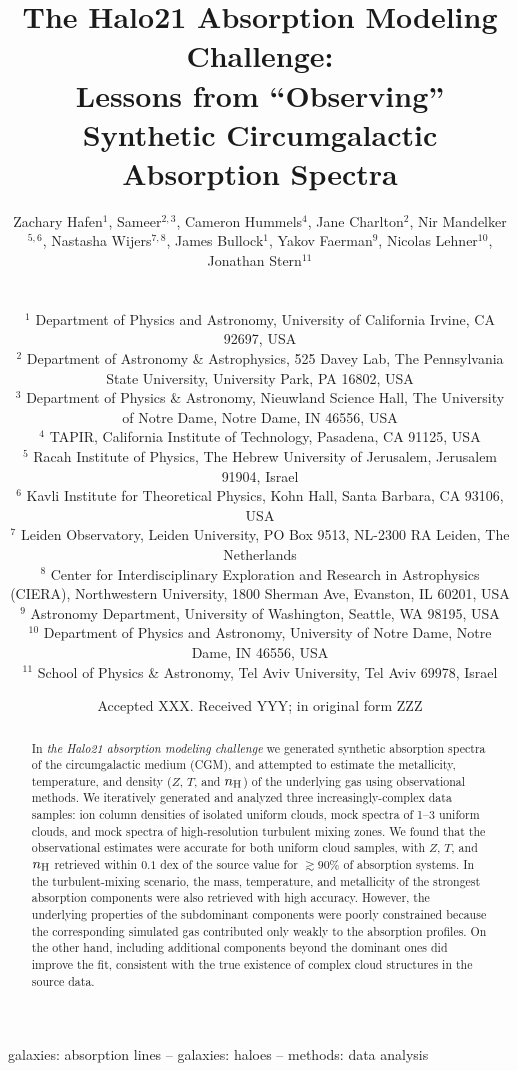 \documentclass[fleqn,usenatbib]{mnras}
\title[``Observing'' Synthetic Circumgalactic Absorption Spectra]{The Halo21 Absorption Modeling Challenge:\\Lessons from ``Observing'' Synthetic Circumgalactic Absorption Spectra}
\author[Hafen, Sameer, et al.]{
\parbox{\textwidth}{
Zachary Hafen$^{1}$,
Sameer$^{2,3}$,
Cameron Hummels$^4$,
Jane Charlton$^2$,
Nir Mandelker$^{5, 6}$,
Nastasha Wijers$^{7, 8}$,
James Bullock$^{1}$,
Yakov Faerman$^{9}$,
Nicolas Lehner$^{10}$,
Jonathan Stern$^{11}$
} \vspace{0.4cm}\\
\parbox{\textwidth}{
$^1$ Department of Physics and Astronomy, University of California Irvine, CA 92697, USA \\
$^{2}$ Department of Astronomy \& Astrophysics, 525 Davey Lab, The Pennsylvania State University, University Park, PA 16802, USA \\
$^{3}$ Department of Physics \& Astronomy, Nieuwland Science Hall, The University of Notre Dame, Notre Dame, IN 46556, USA \\
$^4$ TAPIR, California Institute of Technology, Pasadena, CA 91125, USA \\
$^5$ Racah Institute of Physics, The Hebrew University of Jerusalem,
Jerusalem 91904, Israel \\
$^6$ Kavli Institute for Theoretical Physics, Kohn Hall, Santa Barbara, CA 93106, USA\\
$^7$ Leiden Observatory, Leiden University, PO Box 9513, NL-2300 RA Leiden, The Netherlands \\
$^8$ Center for Interdisciplinary Exploration and Research in Astrophysics (CIERA), Northwestern University, 1800 Sherman Ave, Evanston, IL 60201, USA \\
$^9$ Astronomy Department, University of Washington, Seattle, WA 98195, USA \\
$^{10}$ Department of Physics and Astronomy, University of Notre Dame, Notre Dame, IN 46556, USA \\
$^{11}$ School of Physics \& Astronomy, Tel Aviv University, Tel Aviv 69978, Israel
}
}
\date{Accepted XXX. Received YYY; in original form ZZZ}
\makeatletter
\newcommand{\thoughts}[1]{\textcolor{BurntOrange}{\textbf{Contributions welcome: #1}}}
\newcommand{\todo}[1]{\textcolor{Maroon}{\textbf{Address: #1}}}
\newcommand{\atsameer}[1]{\textcolor{CornflowerBlue}{\textbf{@Sameer or Jane: #1}}}
\newcommand{\atcameron}[1]{\textcolor{Thistle}{\textbf{@Cameron: #1}}}
\newcommand{\atnastasha}[1]{\textcolor{Plum}{\textbf{@Nastasha: #1}}}
\newcommand{\atnir}[1]{\textcolor{ForestGreen}{\textbf{@Nir: #1}}}
\makeatother
\begin{document}
\label{firstpage}
\pagerange{\pageref{firstpage}--\pageref{lastpage}}
\maketitle

\begin{abstract}
In \textit{the Halo21 absorption modeling challenge} we generated synthetic absorption spectra of the circumgalactic medium (CGM),
and attempted to estimate the metallicity, temperature, and density ($Z$, $T$, and $n_{\rm H}$) of the underlying gas using observational methods.
We iteratively generated and analyzed three increasingly-complex data samples:
ion column densities of isolated uniform clouds,
mock spectra of 1--3 uniform clouds,
and mock spectra of high-resolution turbulent mixing zones.
We found that the observational estimates were accurate for both uniform cloud samples, with $Z$, $T$, and $n_{\rm H}$ retrieved within $0.1$ dex of the source value for $\gtrsim 90\%$ of absorption systems.
In the turbulent-mixing scenario, the mass, temperature, and metallicity of the strongest absorption components were also retrieved with high accuracy.
However, the underlying properties of the subdominant components were poorly constrained because the corresponding simulated gas contributed only weakly to the  absorption profiles.
On the other hand, including
additional components beyond the dominant ones did improve the fit, consistent with the true existence of complex cloud structures in the source data. 
\end{abstract}

\begin{keywords}
galaxies: absorption lines -- galaxies: haloes -- methods: data analysis
\end{keywords}



 
\end{document}
